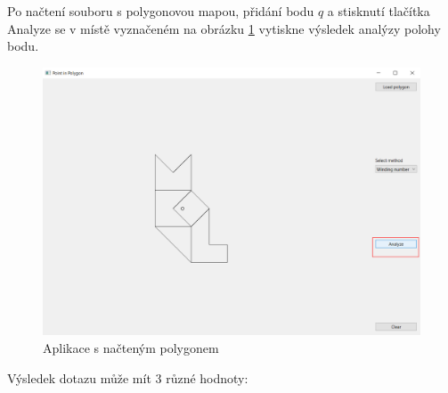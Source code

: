 \documentclass[11pt]{article}
\begin{document}
Po načtení souboru s polygonovou mapou, přidání bodu $q$ a stisknutí tlačítka Analyze se v místě vyznačeném na obrázku \ref{fig:app_analyze} vytiskne výsledek analýzy polohy bodu. 

\begin{figure}[htbh]
	\centering
	\includegraphics[scale=0.4]{images/aplikace_klik_analyze.png} 
	\caption{Aplikace s načteným polygonem}
	\label{fig:app_analyze}
\end{figure} 

Výsledek dotazu může mít 3 různé hodnoty:
\end{document}
